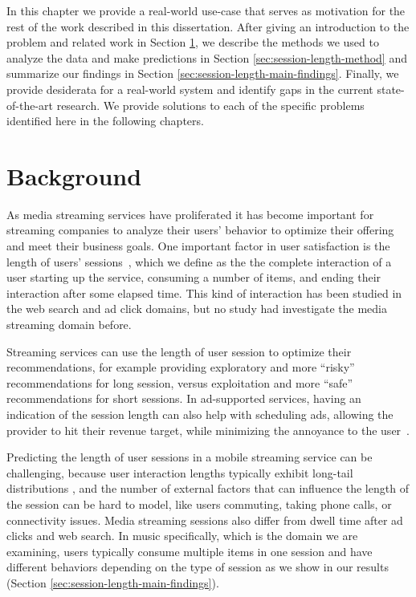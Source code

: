 In this chapter we provide a real-world use-case that serves as motivation 
for the rest of the work described in this dissertation. After giving
an introduction to the problem and related work in Section \ref{sec:session-length-background},
we describe the methods we used to analyze the data and make predictions in
Section \ref{sec:session-length-method} and summarize our findings in Section
\ref{sec:session-length-main-findings}. Finally, we provide desiderata
for a real-world system and identify gaps in the current state-of-the-art
research. We provide solutions to each of the
specific problems identified here in the following chapters.

\section{Background}
\label{sec:session-length-background}

As media streaming services have proliferated it has become important for streaming
companies to analyze their users' behavior to optimize their offering and
meet their business goals. One important factor in user satisfaction is the length of
users' sessions~\cite{dwell-time-satisfaction}, which we define as the
the complete interaction of a
user starting up the service, consuming a number of items, and ending
their interaction after some elapsed time.
This kind of interaction has been studied in the web search \cite{dwell-time-satisfaction, search-time-model} and ad click \cite{post-click-ads, post-click-survival}
domains, but no study had investigate the media streaming domain before.

Streaming services can use the length of user session to optimize their
recommendations, for example providing exploratory and more ``risky'' recommendations
for long session, versus exploitation and more ``safe'' recommendations for short sessions.
In ad-supported services, having an indication of the session length can also help
with scheduling ads, allowing the provider to hit their revenue target, while
minimizing the annoyance to the user~\cite{annoying-ads}.

Predicting the length of user sessions in a mobile streaming service can be challenging,
because user interaction lengths
typically exhibit long-tail distributions \cite{post-click-survival, weibull-web-browsing, phonecalls}, and the number of external factors that can influence the length of the
session can be hard to model, like users commuting, taking phone calls, or connectivity
issues. Media streaming sessions also differ from dwell time after ad clicks
and web search. In music specifically, which is the domain we are examining,
users typically consume multiple items in one session and have different behaviors
depending on the type of session as we show in our results (Section \ref{sec:session-length-main-findings}).

